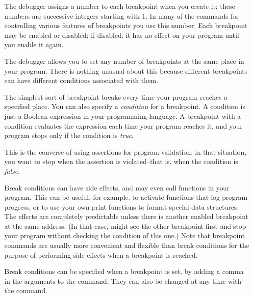 The debugger assigns a number to each breakpoint when you create it;
these numbers are successive integers starting with 1.  In many of the
commands for controlling various features of breakpoints you use this
number.  Each breakpoint may be enabled or disabled; if disabled, it
has no effect on your program until you enable it again.

The debugger allows you to set any number of breakpoints at the same
place in your program.  There is nothing unusual about this because
different breakpoints can have different conditions associated with them.

The simplest sort of breakpoint breaks every time your program reaches
a specified place.  You can also specify a \emph{condition} for a
breakpoint.  A condition is just a Boolean expression in your
programming language.  A breakpoint with a condition evaluates the
expression each time your program reaches it, and your program stops
only if the condition is \emph{true}.

This is the converse of using assertions for program validation; in
that situation, you want to stop when the assertion is violated--that
is, when the condition is \emph{false}.

Break conditions can have side effects, and may even call functions in
your program.  This can be useful, for example, to activate functions
that log program progress, or to use your own print functions to
format special data structures. The effects are completely predictable
unless there is another enabled breakpoint at the same address.  (In
that case,  might see the other breakpoint first and stop your
program without checking the condition of this one.)  Note that
breakpoint commands are usually more convenient and flexible than break
conditions for the
purpose of performing side effects when a breakpoint is reached.

Break conditions can be specified when a breakpoint is set, by adding
a comma in the arguments to the  command. They can also be
changed at any time with the  command.

